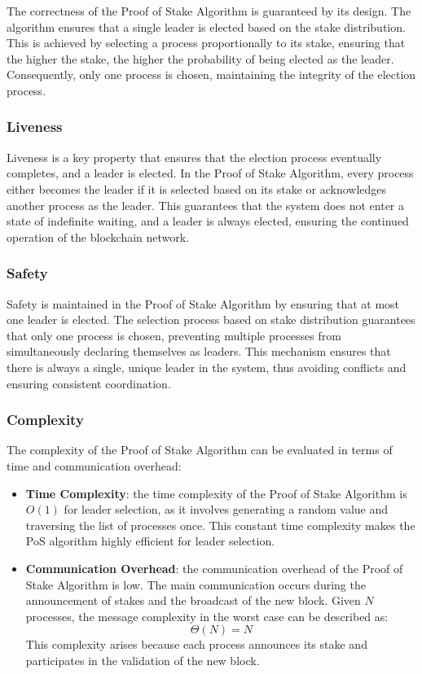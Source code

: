 The correctness of the Proof of Stake Algorithm is guaranteed by its design. The algorithm ensures that a single leader is elected based on the stake distribution. This is achieved by selecting a process proportionally to its stake, ensuring that the higher the stake, the higher the probability of being elected as the leader. Consequently, only one process is chosen, maintaining the integrity of the election process.

\subsubsection{Liveness}

Liveness is a key property that ensures that the election process eventually completes, and a leader is elected. In the Proof of Stake Algorithm, every process either becomes the leader if it is selected based on its stake or acknowledges another process as the leader. This guarantees that the system does not enter a state of indefinite waiting, and a leader is always elected, ensuring the continued operation of the blockchain network.

\subsubsection{Safety}

Safety is maintained in the Proof of Stake Algorithm by ensuring that at most one leader is elected. The selection process based on stake distribution guarantees that only one process is chosen, preventing multiple processes from simultaneously declaring themselves as leaders. This mechanism ensures that there is always a single, unique leader in the system, thus avoiding conflicts and ensuring consistent coordination.

\subsubsection{Complexity}

The complexity of the Proof of Stake Algorithm can be evaluated in terms of time and communication overhead:
\begin{itemize}
    \item \textbf{Time Complexity}: the time complexity of the Proof of Stake Algorithm is \(O(1)\) for leader selection, as it involves generating a random value and traversing the list of processes once. This constant time complexity makes the PoS algorithm highly efficient for leader selection.
    \item \textbf{Communication Overhead}: the communication overhead of the Proof of Stake Algorithm is low. The main communication occurs during the announcement of stakes and the broadcast of the new block. Given \(N\) processes, the message complexity in the worst case can be described as:
\[
\Theta(N) = N
\]
This complexity arises because each process announces its stake and participates in the validation of the new block.
\end{itemize}

